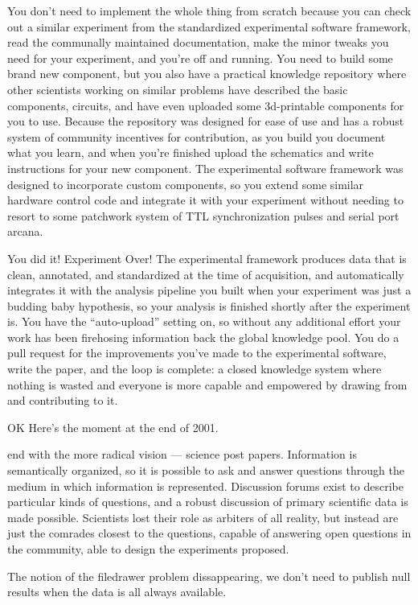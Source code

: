 \documentclass[11pt]{article}
\begin{document}
\begin{multicols}{2}
You don't need to implement the whole thing from scratch because you can
check out a similar experiment from the standardized experimental
software framework, read the communally maintained documentation, make
the minor tweaks you need for your experiment, and you're off and
running. You need to build some brand new component, but you also have a
practical knowledge repository where other scientists working on similar
problems have described the basic components, circuits, and have even
uploaded some 3d-printable components for you to use. Because the
repository was designed for ease of use and has a robust system of
community incentives for contribution, as you build you document what
you learn, and when you're finished upload the schematics and write
instructions for your new component. The experimental software framework
was designed to incorporate custom components, so you extend some
similar hardware control code and integrate it with your experiment
without needing to resort to some patchwork system of TTL
synchronization pulses and serial port arcana.

You did it! Experiment Over! The experimental framework produces data
that is clean, annotated, and standardized at the time of acquisition,
and automatically integrates it with the analysis pipeline you built
when your experiment was just a budding baby hypothesis, so your
analysis is finished shortly after the experiment is. You have the
``auto-upload'' setting on, so without any additional effort your work
has been firehosing information back the global knowledge pool. You do a
pull request for the improvements you've made to the experimental
software, write the paper, and the loop is complete: a closed knowledge
system where nothing is wasted and everyone is more capable and
empowered by drawing from and contributing to it.

OK Here's the moment at the end of 2001.

end with the more radical vision --- science post papers. Information is
semantically organized, so it is possible to ask and answer questions
through the medium in which information is represented. Discussion
forums exist to describe particular kinds of questions, and a robust
discussion of primary scientific data is made possible. Scientists lost
their role as arbiters of all reality, but instead are just the comrades
closest to the questions, capable of answering open questions in the
community, able to design the experiments proposed.

The notion of the filedrawer problem dissappearing, we don't need to
publish null results when the data is all always available.


\end{multicols}
\end{document}
